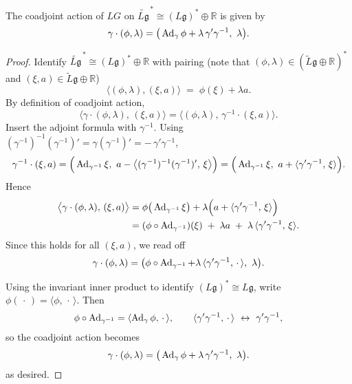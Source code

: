 \documentclass[12pt]{article}
\begin{document}
\begin{proposition}
    The coadjoint action of $LG$ on $\widetilde{L\mathfrak g}^{\,*}\cong (L\mathfrak g)^{*}\oplus\mathbb R$ is given by
    \[
        \gamma\cdot(\phi,\lambda)=\big(\operatorname{Ad}_\gamma \phi+\lambda\,\gamma'\gamma^{-1},\ \lambda\big).
    \]
\end{proposition}
\begin{proof}
    Identify $\widetilde{L\mathfrak g}^{\,*}\cong (L\mathfrak g)^{*}\oplus\mathbb R$ with pairing (note that $(\phi,\lambda) \in (\tilde L \mathfrak g \oplus \mathbb R)^*$ and $(\xi,a) \in \tilde L \mathfrak g \oplus \mathbb R$)
    \[
        \langle (\phi,\lambda),(\xi,a)\rangle\;=\;\phi(\xi)+\lambda a.
    \]
    By definition of coadjoint action,
    \[
        \big\langle \gamma\cdot(\phi,\lambda),\,(\xi,a)\big\rangle
        =\big\langle (\phi,\lambda),\,\gamma^{-1}\cdot(\xi,a)\big\rangle.
    \]
    Insert the adjoint formula with $\gamma^{-1}$. Using $(\gamma^{-1})^{-1}(\gamma^{-1})'=\gamma(\gamma^{-1})'=-\,\gamma'\gamma^{-1}$,
    \[
        \gamma^{-1}\cdot(\xi,a)
        =\Big(\operatorname{Ad}_{\gamma^{-1}}\xi,\ a-\big\langle (\gamma^{-1})^{-1}(\gamma^{-1})',\,\xi\big\rangle\Big)
        =\Big(\operatorname{Ad}_{\gamma^{-1}}\xi,\ a+\langle \gamma'\gamma^{-1},\,\xi\rangle\Big).
    \]
    Hence
    \[
        \begin{aligned}
            \big\langle \gamma\cdot(\phi,\lambda),\,(\xi,a)\big\rangle
             & =\phi\big(\operatorname{Ad}_{\gamma^{-1}}\xi\big)+\lambda\Big(a+\langle \gamma'\gamma^{-1},\,\xi\rangle\Big)         \\
             & =(\phi\circ\operatorname{Ad}_{\gamma^{-1}})(\xi)\;+\;\lambda a\;+\;\lambda\,\langle \gamma'\gamma^{-1},\,\xi\rangle.
        \end{aligned}
    \]
    Since this holds for all $(\xi,a)$, we read off
    \[
        \gamma\cdot(\phi,\lambda)
        =\big(\phi\circ\operatorname{Ad}_{\gamma^{-1}}+\lambda\,\langle \gamma'\gamma^{-1},\,\cdot\,\rangle,\ \lambda\big).
    \]

    Using the invariant inner product to identify $(L\mathfrak g)^*\cong L\mathfrak g$, write $\phi(\,\cdot\,)=\langle \phi,\,\cdot\,\rangle$. Then
    \[
        \phi\circ\Ad_{\gamma^{-1}}=\langle \Ad_\gamma \phi,\,\cdot\,\rangle,\qquad
        \langle \gamma'\gamma^{-1},\,\cdot\,\rangle\ \leftrightarrow\ \gamma'\gamma^{-1},
    \]
    so the coadjoint action becomes
    \[
        \gamma\cdot(\phi,\lambda)=\big(\operatorname{Ad}_\gamma \phi+\lambda\,\gamma'\gamma^{-1},\ \lambda\big).
    \]
    as desired. \end{proof}
\end{document}
